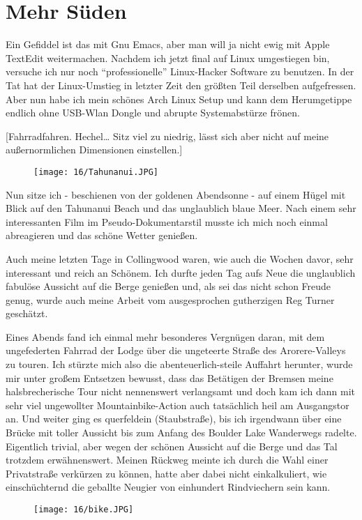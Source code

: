 \chapter{Mehr S\"uden}

Ein Gefiddel ist das mit Gnu Emacs, aber man will ja nicht ewig mit
Apple TextEdit weitermachen. Nachdem ich jetzt final auf Linux
umgestiegen bin, versuche ich nur noch ``professionelle'' Linux-Hacker
Software zu benutzen. In der Tat hat der Linux-Umstieg in letzter Zeit
den größten Teil derselben aufgefressen. Aber nun habe ich mein schönes
Arch Linux Setup und kann dem Herumgetippe endlich ohne USB-Wlan Dongle
und abrupte Systemabstürze frönen.

{[}Fahrradfahren. Hechel\ldots{} Sitz viel zu niedrig, lässt sich aber
nicht auf meine außernormlichen Dimensionen einstellen.{]}

\begin{figure}[h]
  \centering
  \texttt{[image: 16/Tahunanui.JPG]}
\end{figure}
Nun sitze ich - beschienen von der goldenen Abendsonne - auf einem Hügel
mit Blick auf den Tahunanui Beach und das unglaublich blaue Meer. Nach
einem sehr interessanten Film im Pseudo-Dokumentarstil musste ich mich
noch einmal abreagieren und das schöne Wetter genießen.

Auch meine letzten Tage in Collingwood waren, wie auch die Wochen davor,
sehr interessant und reich an Schönem. Ich durfte jeden Tag aufs Neue
die unglaublich fabulöse Aussicht auf die Berge genießen und, als sei
das nicht schon Freude genug, wurde auch meine Arbeit vom ausgesprochen
gutherzigen Reg Turner geschätzt.

Eines Abends fand ich einmal mehr besonderes Vergnügen daran, mit dem
ungefederten Fahrrad der Lodge über die ungeteerte Straße des
Arorere-Valleys zu touren. Ich stürzte mich also die
abenteuerlich-steile Auffahrt herunter, wurde mir unter großem Entsetzen
bewusst, dass das Betätigen der Bremsen meine halsbrecherische Tour
nicht nennenswert verlangsamt und doch kam ich dann mit sehr viel
ungewollter Mountainbike-Action auch tatsächlich heil am Ausgangstor an.
Und weiter ging es querfeldein (Staubstraße), bis ich irgendwann über
eine Brücke mit toller Aussicht bis zum Anfang des Boulder Lake
Wanderwegs radelte. Eigentlich trivial, aber wegen der schönen Aussicht
auf die Berge und das Tal trotzdem erwähnenswert. Meinen Rückweg meinte
ich durch die Wahl einer Privatstraße verkürzen zu können, hatte aber
dabei nicht einkalkuliert, wie einschüchternd die geballte Neugier von
einhundert Rindviechern sein kann.
\begin{figure}[h]
  \centering
  \texttt{[image: 16/bike.JPG]}
\end{figure}

